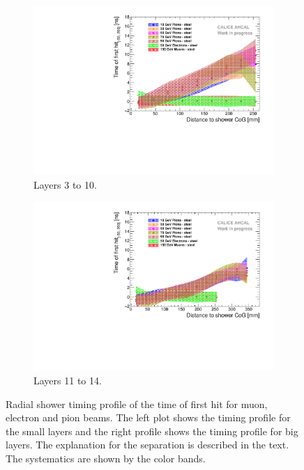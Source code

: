 \begin{figure}[htbp!]
	\begin{subfigure}[t]{0.5\textwidth}
		\centering
		\includegraphics[width=1\textwidth]{../Thesis_Plots/Timing/Pions/Plots/Timing_Radius_Comparison_ShortAsymRange_SSF.pdf}
		\caption{Layers 3 to 10.}\label{fig:Radius_Comparison_SSF}
	\end{subfigure}
	\hfill
	\begin{subfigure}[t]{0.5\textwidth}
		\centering
		\includegraphics[width=1\textwidth]{../Thesis_Plots/Timing/Pions/Plots/Timing_Radius_Comparison_ShortAsymRange_BL.pdf}
		\caption{Layers 11 to 14.}\label{fig:Radius_Comparison_BL}
	\end{subfigure}
	\caption{Radial shower timing profile of the time of first hit for muon, electron and pion beams. The left plot shows the timing profile for the small layers and the right profile shows the timing profile for big layers. The explanation for the separation is described in the text. The systematics are shown by the color bands.}
	\label{fig:RadialTiming}
\end{figure}

